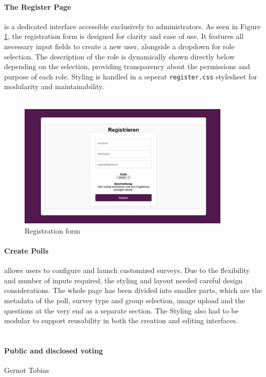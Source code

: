 \documentclass[a4paper,12pt]{report}
\begin{document}
\paragraph{The Register Page} is a dedicated interface accessible exclusively to administrators. As seen in Figure \ref{fig:register_view}, the registration form is designed for clarity and ease of use. It features all necessary input fields to create a new user, alongside a dropdown for role selection. The description of the role is dynamically shown directly below depending on the selection, providing transparency about the permissions and purpose of each role. Styling is handled in a seperat \texttt{register.css} stylesheet for modularity and maintainability.\\\\ 
\begin{figure}[H]
\centering
\includegraphics[width=0.9\textwidth]{pics/register_view.jpg}
\caption{Registration form}
\label{fig:register_view}
\end{figure}
\paragraph{Create Polls} allows users to configure and launch customized surveys. Due to the flexibility and number of inputs required, the styling and layout needed careful design considerations. The whole page has been divided into smaller parts, which are the metadata of the poll, survey type and group selection, image upload and the questions at the very end as a separate section. The Styling also had to be modular to support reusability in both the creation and editing interfaces.\\\\
\paragraph{Public and disclosed voting} Gernot Tobias
\end{document}
